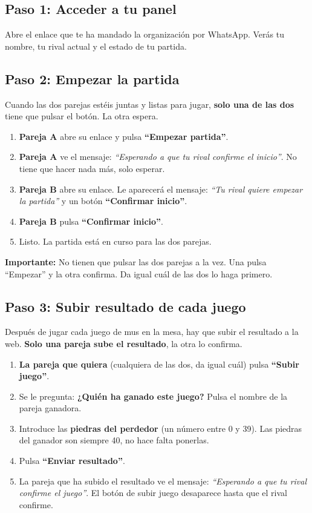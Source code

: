 \documentclass[11pt,a4paper]{article}
\begin{document}
\subsection{Paso 1: Acceder a tu panel}

Abre el enlace que te ha mandado la organización por WhatsApp. Verás tu nombre, tu rival actual y el estado de tu partida.

\subsection{Paso 2: Empezar la partida}

Cuando las dos parejas estéis juntas y listas para jugar, \textbf{solo una de las dos} tiene que pulsar el botón. La otra espera.

\begin{enumerate}
    \item \textbf{Pareja A} abre su enlace y pulsa \textbf{``Empezar partida''}.
    \item \textbf{Pareja A} ve el mensaje: \textit{``Esperando a que tu rival confirme el inicio''}. No tiene que hacer nada más, solo esperar.
    \item \textbf{Pareja B} abre su enlace. Le aparecerá el mensaje: \textit{``Tu rival quiere empezar la partida''} y un botón \textbf{``Confirmar inicio''}.
    \item \textbf{Pareja B} pulsa \textbf{``Confirmar inicio''}.
    \item Listo. La partida está en curso para las dos parejas.
\end{enumerate}

\textbf{Importante:} No tienen que pulsar las dos parejas a la vez. Una pulsa ``Empezar'' y la otra confirma. Da igual cuál de las dos lo haga primero.

\subsection{Paso 3: Subir resultado de cada juego}

Después de jugar cada juego de mus en la mesa, hay que subir el resultado a la web. \textbf{Solo una pareja sube el resultado}, la otra lo confirma.

\begin{enumerate}
    \item \textbf{La pareja que quiera} (cualquiera de las dos, da igual cuál) pulsa \textbf{``Subir juego''}.
    \item Se le pregunta: \textbf{¿Quién ha ganado este juego?} Pulsa el nombre de la pareja ganadora.
    \item Introduce las \textbf{piedras del perdedor} (un número entre 0 y 39). Las piedras del ganador son siempre 40, no hace falta ponerlas.
    \item Pulsa \textbf{``Enviar resultado''}.
    \item La pareja que ha subido el resultado ve el mensaje: \textit{``Esperando a que tu rival confirme el juego''}. El botón de subir juego desaparece hasta que el rival confirme.
\end{enumerate}
\end{document}
